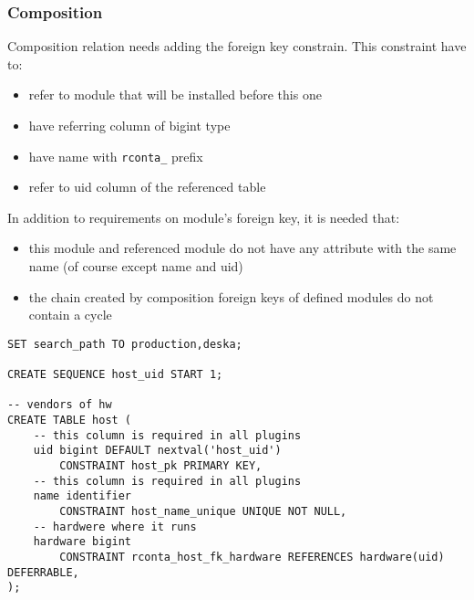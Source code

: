 \documentclass[deska]{subfiles}
\begin{document}
\subsubsection{Composition}
Composition relation needs adding the foreign key constrain. This constraint have to:
\begin{itemize}
    \item refer to module that will be installed before this one
    \item have referring column of bigint type
    \item have name with {\tt rconta\_} prefix
    \item refer to uid column of the referenced table
\end{itemize}
In addition to requirements on module's foreign key, it is needed that:
\begin{itemize}
    \item this module and referenced module do not have any attribute with the same name (of course except name and uid)
    \item the chain created by composition foreign keys of defined modules do not contain a cycle
\end{itemize}

\begin{verbatim}
SET search_path TO production,deska;

CREATE SEQUENCE host_uid START 1;

-- vendors of hw
CREATE TABLE host (
    -- this column is required in all plugins
    uid bigint DEFAULT nextval('host_uid')
        CONSTRAINT host_pk PRIMARY KEY,
    -- this column is required in all plugins
    name identifier
        CONSTRAINT host_name_unique UNIQUE NOT NULL,
    -- hardwere where it runs
    hardware bigint
        CONSTRAINT rconta_host_fk_hardware REFERENCES hardware(uid) DEFERRABLE,
);
\end{verbatim}
\end{document}
